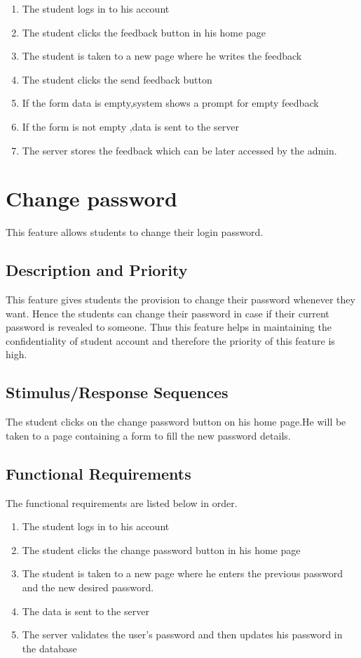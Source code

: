 \documentclass{scrreprt}
\begin{document}
\begin{enumerate}
    \item The student logs in to his account 
    \item The student clicks the feedback button in his home page
    \item The student is taken to a new page where he writes the feedback
    \item The student clicks the send feedback button
    \item If the form data is empty,system shows a prompt for empty feedback
    \item If the form is not empty ,data is sent to the server
    \item The server stores the feedback which can be later accessed by the admin.
\end{enumerate} 

\section{Change password}
This feature allows students to change their login password.

\subsection{Description and Priority}
This feature gives students the provision to change their password whenever they want. Hence the students can change their password in case if their current password is revealed to someone. Thus this feature helps in maintaining the confidentiality of student account and therefore the priority of this feature is high.

\subsection{Stimulus/Response Sequences}
The student clicks on the change password button on his home page.He will be taken to a page containing a form to fill the new password details.
\subsection{Functional Requirements}
The functional requirements are listed below in order.
 
 \begin{enumerate}
    \item The student logs in to his account 
    \item The student clicks the change password button in his home page
    \item The student is taken to a new page where he enters the previous password and the new desired password.
    \item The data is sent to the server
    \item The server validates the user's password and then updates his password in the database
\end{enumerate} 
\end{document}
